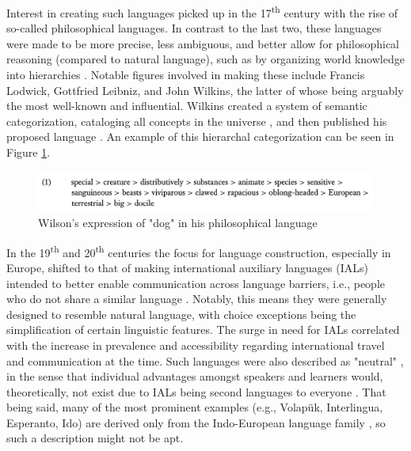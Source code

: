 \documentclass[12pt,a4paper]{article}
\numberwithin{figure}{section}
\numberwithin{table}{section}
\numberwithin{definition}{section}
\begin{document}
Interest in creating such languages picked up in the 17\textsuperscript{th} century with the rise of so-called philosophical languages. In contrast to the last two, these languages were made to be more precise, less ambiguous, and better allow for philosophical reasoning (compared to natural language), such as by organizing world knowledge into hierarchies \parencite{goodall2022article}. Notable figures involved in making these include Francis Lodwick, Gottfried Leibniz, and John Wilkins, the latter of whose being arguably the most well-known and influential. Wilkins created a system of semantic categorization, cataloging all concepts in the universe \parencite{okrent2009book}, and then published his proposed language \parencite{Wilkins1968book}. An example of this hierarchal categorization can be seen in Figure \ref{fig:wilsonslanguageexample}.


\begin{figure}
  \centering
        \includegraphics[width=1.0\textwidth]{WilsonsLanguageExample.png}
        \caption{Wilson's expression of "dog" in his philosophical language \parencite{goodall2022article}}
        \label{fig:wilsonslanguageexample}
\end{figure}


In the 19\textsuperscript{th} and 20\textsuperscript{th} centuries the focus for language construction, especially in Europe, shifted to that of making international auxiliary languages (IALs) intended to better enable communication across language barriers, i.e., people who do not share a similar language \parencite{goodall2022article}. Notably, this means they were generally designed to resemble natural language, with choice exceptions being the simplification of certain linguistic features. The surge in need for IALs correlated with the increase in prevalence and accessibility regarding international travel and communication at the time. Such languages were also described as "neutral" \parencite{Large1985book}, in the sense that individual advantages amongst speakers and learners would, theoretically, not exist due to IALs being second languages to everyone \parencite{Gobbo2016article}. That being said, many of the most prominent examples (e.g., Volapük, Interlingua, Esperanto, Ido) are derived only from the Indo-European language family \parencite{Novikov2022article,goodall2022article}, so such a description might not be apt. 
\end{document}
